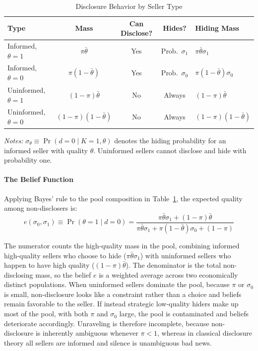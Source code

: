 \begin{table}[htbp]
\centering
\caption{Disclosure Behavior by Seller Type}
\label{tab:who_hides}
\small
\renewcommand{\arraystretch}{1.3}
\setlength{\tabcolsep}{20pt}
\begin{tabular}{lcccl}
\toprule
\toprule
\textbf{Type} & \textbf{Mass} & \textbf{Can Disclose?} & \textbf{Hides?} & \textbf{Hiding Mass} \\
\midrule
Informed, $\theta=1$ & $\pi \bar{\theta}$ & Yes & Prob.\ $\sigma_1$ & $\pi \bar{\theta} \sigma_1$ \\
Informed, $\theta=0$ & $\pi (1-\bar{\theta})$ & Yes & Prob.\ $\sigma_0$ & $\pi (1-\bar{\theta}) \sigma_0$ \\
Uninformed, $\theta=1$ & $(1-\pi) \bar{\theta}$ & No & Always & $(1-\pi) \bar{\theta}$ \\
Uninformed, $\theta=0$ & $(1-\pi) (1-\bar{\theta})$ & No & Always & $(1-\pi) (1-\bar{\theta})$ \\
\bottomrule
\bottomrule
\end{tabular}

\vspace{0.5em}
\raggedright
\footnotesize
\textit{Notes:} $\sigma_\theta \equiv \Pr(d=0 \mid K=1, \theta)$ denotes the hiding probability for an informed seller with quality $\theta$. Uninformed sellers cannot disclose and hide with probability one.
\end{table}

\paragraph{The Belief Function}

Applying Bayes' rule to the pool composition in Table~\ref{tab:who_hides}, the expected quality among non-disclosers is:
\begin{equation}
    e(\sigma_0, \sigma_1) \equiv \Pr(\theta=1 \mid d=0) = \frac{\pi \bar{\theta} \sigma_1 + (1-\pi) \bar{\theta}}{\pi \bar{\theta} \sigma_1 + \pi (1-\bar{\theta}) \sigma_0 + (1-\pi)}
    \label{eq:belief_general}
\end{equation}

The numerator counts the high-quality mass in the pool, combining informed high-quality sellers who choose to hide ($\pi\bar{\theta}\sigma_1$) with uninformed sellers who happen to have high quality ($(1-\pi)\bar{\theta}$). The denominator is the total non-disclosing mass, so the belief $e$ is a weighted average across two economically distinct populations. When uninformed sellers dominate the pool, because $\pi$ or $\sigma_0$ is small, non-disclosure looks like a constraint rather than a choice and beliefs remain favorable to the seller. If instead strategic low-quality hiders make up most of the pool, with both $\pi$ and $\sigma_0$ large, the pool is contaminated and beliefs deteriorate accordingly. Unraveling is therefore incomplete, because non-disclosure is inherently ambiguous whenever $\pi < 1$, whereas in classical disclosure theory all sellers are informed and silence is unambiguous bad news.

